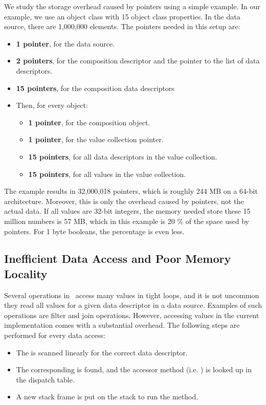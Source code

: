 We study the storage overhead caused by pointers using a simple example. In our example, we use an object class with 15 object class properties. In the data source, there are 1,000,000 elements. The pointers needed in this setup are:
\begin{itemize}
    \item \textbf{1 pointer}, for the data source.
    \item \textbf{2 pointers}, for the composition descriptor and the pointer to the list of data descriptors.
    \item \textbf{15 pointers}, for the composition data descriptors
    \item Then, for every object:
    \begin{itemize}
        \item \textbf{1 pointer}, for the composition object.
        \item \textbf{1 pointer}, for the value collection pointer.
        \item \textbf{15 pointers}, for all data descriptors in the value collection.
        \item \textbf{15 pointers}, for all values in the value collection.
    \end{itemize}
\end{itemize}
The example results in 32,000,018 pointers, which is roughly 244 MB on a 64-bit architecture. Moreover, this is only the overhead caused by pointers, not the actual data. If all values are 32-bit integers, the memory needed store these 15 million numbers is 57 MB, which in this example is 20 \% of the space used by pointers. For 1 byte booleans, the percentage is even less.

\subsection{Inefficient Data Access and Poor Memory Locality}
\label{sub:Inefficient Data Access and Poor Memory Locality}
Several operations in \gap~access many values in tight loops, and it is not uncommon they read all values for a given data descriptor in a data source. Examples of such operations are filter and join operations. However, accessing values in the current implementation comes with a substantial overhead. The following steps are performed for every data access:
\begin{itemize}
    \item The  is scanned linearly for the correct data descriptor.
    \item The corresponding  is found, and the accessor method (i.e. ) is looked up in the dispatch table.
    \item A new stack frame is put on the stack to run the  method.
\end{itemize}

